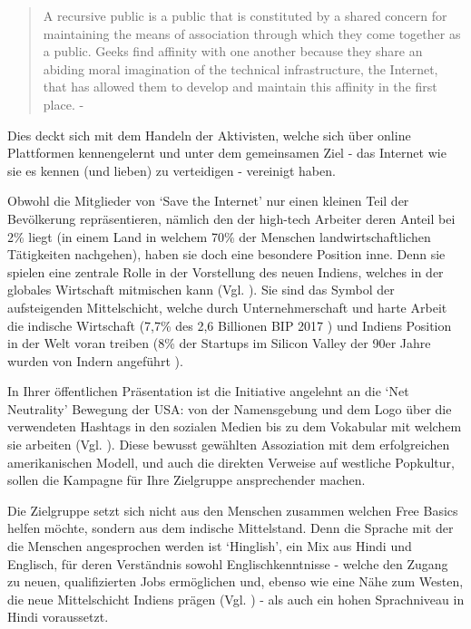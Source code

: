 \documentclass{article}
\begin{document}
\begin{quote}
A recursive public is a public that is constituted by a shared concern for maintaining the means of association through which they come together as a public.
Geeks find affinity with one another because they share an abiding moral imagination of the technical infrastructure, the Internet, that has allowed them to develop and maintain this affinity in the first place. - \cite[28]{twoBits}
\end{quote}

\medskip

Dies deckt sich mit dem Handeln der Aktivisten, welche sich über online Plattformen kennengelernt und unter dem gemeinsamen Ziel - das Internet wie sie es kennen (und lieben) zu verteidigen - vereinigt haben.

\medskip

Obwohl die Mitglieder von `Save the Internet' nur einen kleinen Teil der Bevölkerung repräsentieren, nämlich den der high-tech Arbeiter deren Anteil bei 2\% liegt (in einem Land in welchem 70\% der Menschen landwirtschaftlichen Tätigkeiten nachgehen), haben sie doch eine besondere Position inne. Denn sie spielen eine zentrale Rolle in der Vorstellung des neuen Indiens, welches in der globales Wirtschaft mitmischen kann (Vgl. \cite{thomas2012}).
Sie sind das Symbol der aufsteigenden Mittelschicht, welche durch Unternehmerschaft und harte Arbeit die indische Wirtschaft (7,7\% des 2,6 Billionen BIP 2017 \autocite{statistaIndiaGDP}\autocite{imfIndiaGDP}) und Indiens Position in der Welt voran treiben (8\% der Startups im Silicon Valley der 90er Jahre wurden von Indern angeführt \parencite{upadhya2004}).

\medskip

In Ihrer öffentlichen Präsentation ist die Initiative angelehnt an die `Net Neutrality' Bewegung der USA: von der Namensgebung und dem Logo über die verwendeten Hashtags in den sozialen Medien bis zu dem Vokabular mit welchem sie arbeiten (Vgl. \cite{prasad2017}).
Diese bewusst gewählten Assoziation mit dem erfolgreichen amerikanischen Modell, und auch die direkten Verweise auf westliche Popkultur, sollen die Kampagne für Ihre Zielgruppe ansprechender machen.

Die Zielgruppe setzt sich nicht aus den Menschen zusammen welchen Free Basics helfen möchte, sondern aus dem indische Mittelstand. Denn die Sprache mit der die Menschen angesprochen werden ist `Hinglish', ein Mix aus Hindi und Englisch, für deren Verständnis sowohl Englischkenntnisse - welche den Zugang zu neuen, qualifizierten Jobs ermöglichen und, ebenso wie eine Nähe zum Westen, die neue Mittelschicht Indiens prägen (Vgl. \cite{fernandes2006}) - als auch ein hohen Sprachniveau in Hindi voraussetzt.
\end{document}
